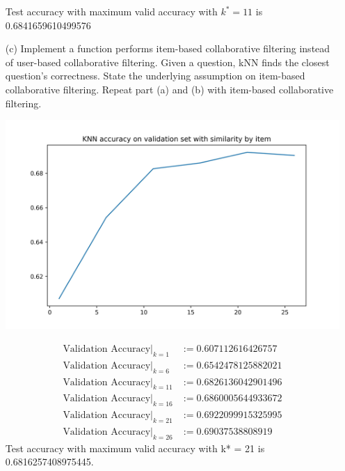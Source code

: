 \begin{itemize}
	Test accuracy with maximum valid accuracy with $k^* = 11$ is 0.6841659610499576
	\item[(c)] Implement a function performs item-based collaborative filtering instead of user-based collaborative filtering. Given a question, kNN finds the closest question's correctness. State the underlying assumption on item-based collaborative filtering. Repeat part (a) and (b) with item-based collaborative filtering.
	\begin{center}
		\includegraphics[scale=0.8]{../out/KNN_item.jpg}
	\end{center}
	\begin{align*}
		\text{Validation Accuracy} \mid_{k=1} &:= 0.607112616426757\\
		\text{Validation Accuracy} \mid_{k=6} &:= 0.6542478125882021\\
		\text{Validation Accuracy} \mid_{k=11} &:= 0.6826136042901496\\
		\text{Validation Accuracy} \mid_{k=16} &:= 0.6860005644933672\\
		\text{Validation Accuracy} \mid_{k=21} &:= 0.6922099915325995\\
		\text{Validation Accuracy} \mid_{k=26} &:= 0.69037538808919
	\end{align*}
	Test accuracy with maximum valid accuracy with k* = 21 is 0.6816257408975445.
	

\end{itemize}
